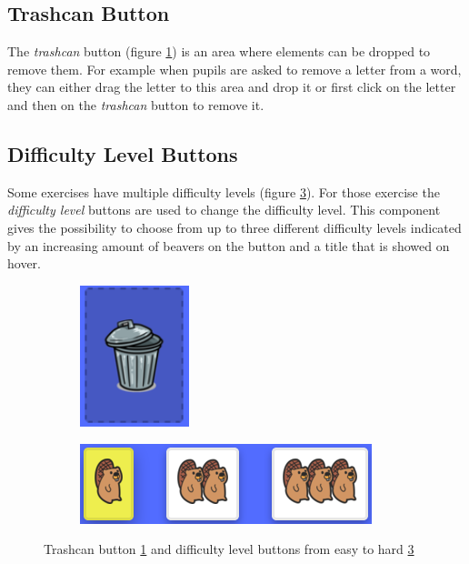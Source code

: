 \subsection*{Trashcan Button}
The \textit{trashcan} button (figure \ref{fig:trashcan}) is an area where elements can be dropped to remove them. For example when pupils are asked to remove a letter from a word, they can either drag the letter to this area and drop it or first click on the letter and then on the \textit{trashcan} button to remove it.

\subsection*{Difficulty Level Buttons}
Some exercises have multiple difficulty levels (figure \ref{fig:difficultyLevels}). For those exercise the \textit{difficulty level} buttons are used to change the difficulty level. This component gives the possibility to choose from up to three different difficulty levels indicated by an increasing amount of beavers on the button and a title that is showed on hover.

\begin{figure}[h]
    \centering
    \begin{subfigure}[b]{0.3\textwidth}
        \centering
        \includegraphics[width=0.35\textwidth]{figures/trashcan.png}
        \subcaption{}
        \label{fig:trashcan} 
    \end{subfigure}
    \begin{subfigure}[b]{0.5\textwidth}
        \centering
        \includegraphics[width=\textwidth]{figures/difficulty_level.png}
        \subcaption{}
        \label{fig:difficultyLevels} 
    \end{subfigure}
    \caption{Trashcan button \ref{fig:trashcan} and difficulty level buttons from easy to hard \ref{fig:difficultyLevels}}
\end{figure}

